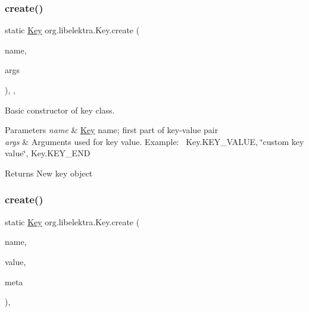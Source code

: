 \subsubsection{\texorpdfstring{create()}{create()}\hspace{0.1cm}{\footnotesize\ttfamily [1/3]}}
{\footnotesize\ttfamily static \mbox{\hyperlink{classorg_1_1libelektra_1_1Key}{Key}} org.\+libelektra.\+Key.\+create (\begin{DoxyParamCaption}\item[{final String}]{name,  }\item[{final Object...}]{args }\end{DoxyParamCaption})\hspace{0.3cm}{\ttfamily [inline]}, {\ttfamily [static]}, {\ttfamily [protected]}}



Basic constructor of key class. 


\begin{DoxyParams}{Parameters}
{\em name} & \mbox{\hyperlink{classorg_1_1libelektra_1_1Key}{Key}} name; first part of key-\/value pair \\
\hline
{\em args} & Arguments used for key value. Example\+:~\newline
 Key.\+K\+E\+Y\+\_\+\+V\+A\+L\+UE, \char`\"{}custom key value\char`\"{}, Key.\+K\+E\+Y\+\_\+\+E\+ND \\
\hline
\end{DoxyParams}
\begin{DoxyReturn}{Returns}
New key object 
\end{DoxyReturn}
\mbox{\label{classorg_1_1libelektra_1_1Key_a785f6b8e937d51575a4acc2ebc8f19a2}} 
\subsubsection{\texorpdfstring{create()}{create()}\hspace{0.1cm}{\footnotesize\ttfamily [2/3]}}
{\footnotesize\ttfamily static \mbox{\hyperlink{classorg_1_1libelektra_1_1Key}{Key}} org.\+libelektra.\+Key.\+create (\begin{DoxyParamCaption}\item[{final String}]{name,  }\item[{final Object}]{value,  }\item[{final Key...}]{meta }\end{DoxyParamCaption})\hspace{0.3cm}{\ttfamily [inline]}, {\ttfamily [static]}}



